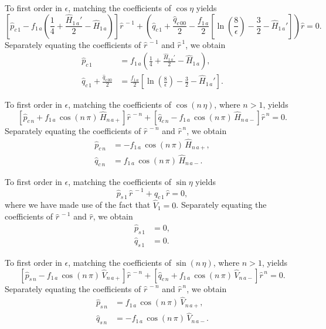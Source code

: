 \documentclass[12pt,prb,aps]{revtex4-1}
\begin{document}
To first order in $\epsilon$, matching the coefficients of $\cos\eta$ yields
\begin{equation}
\left[\hat{p}_{c\,1} - f_{1\,a}\left(\frac{1}{4}+\frac{\hat{H}_{1\,a}'}{2}-\hat{H}_{1\,a}\right)\right]\hat{r}^{\,-1}+ \left(
\hat{q}_{c\,1}+\frac{\hat{q}_{c\,00}}{2} 
-\frac{f_{1\,a}}{2}\left[\ln\left(\frac{8}{\epsilon}\right) -\frac{3}{2}-\hat{H}_{1\,a}'\right]\right)\hat{r}=0.
\end{equation}
Separately equating the coefficients of $\hat{r}^{\,-1}$ and $\hat{r}^{\,1}$, we obtain\,\cite{greene}
\begin{align}
\hat{p}_{c\,1} &= f_{1\,a}\left(\frac{1}{4}+\frac{\hat{H}_{1\,a}'}{2}-\hat{H}_{1\,a}\right),\\[0.5ex]
\hat{q}_{c\,1}+ \frac{\hat{q}_{c\,00}}{2} &= \frac{f_{1\,a}}{2}\left[\ln\left(\frac{8}{\epsilon}\right) -\frac{3}{2}-\hat{H}_{1\,a}'\right].\label{e100e}
\end{align}

To first order in $\epsilon$, matching the coefficients of $\cos(n\,\eta)$, where $n>1$,  yields
\begin{equation}
\left[\hat{p}_{c\,n}+ f_{1\,a}\,\cos(n\,\pi)\,\hat{H}_{n\,a+}\right]\hat{r}^{\,-n}+\left[\hat{q}_{c\,n}-f_{1\,a}\,\cos(n\,\pi)\,\hat{H}_{n\,a-}\right]\hat{r}^{\,n}=0.
\end{equation}
Separately equating the coefficients of $\hat{r}^{\,-n}$ and $\hat{r}^{\,n}$, we obtain
\begin{align}
\hat{p}_{c\,n} &= -f_{1\,a}\,\cos(n\,\pi)\,\hat{H}_{n\,a+},\\[0.5ex]
\hat{q}_{c\,n}&= f_{1\,a}\,\cos(n\,\pi)\,\hat{H}_{n\,a-}.\label{e103e}
\end{align}

To first order in $\epsilon$, matching the coefficients of $\sin\eta$ yields
\begin{equation}
\hat{p}_{s\,1}\,\hat{r}^{\,-1}+\hat{q}_{c\,1}\,\hat{r}=0,
\end{equation}
where we have made use of the fact that $\hat{V}_1=0$. 
Separately equating the coefficients of $\hat{r}^{\,-1}$ and $\hat{r}$, we obtain
\begin{align}
\hat{p}_{s\,1} &=0,\\[0.5ex]
\hat{q}_{s\,1}&= 0.\label{e106e}
\end{align}

To first order in $\epsilon$, matching the coefficients of $\sin(n\,\eta)$, where $n>1$,  yields
\begin{equation}
\left[\hat{p}_{s\,n}- f_{1\,a}\,\cos(n\,\pi)\,\hat{V}_{n\,a+}\right]\hat{r}^{\,-n}+\left[\hat{q}_{c\,n}+f_{1\,a}\,\cos(n\,\pi)\,\hat{V}_{n\,a-}\right]\hat{r}^{\,n}=0.
\end{equation}
Separately equating the coefficients of $\hat{r}^{\,-n}$ and $\hat{r}^{\,n}$, we obtain
\begin{align}
\hat{p}_{s\,n} &= f_{1\,a}\,\cos(n\,\pi)\,\hat{V}_{n\,a+},\\[0.5ex]
\hat{q}_{s\,n}&= -f_{1\,a}\,\cos(n\,\pi)\,\hat{V}_{n\,a-}.\label{e109e}
\end{align}
\end{document}
